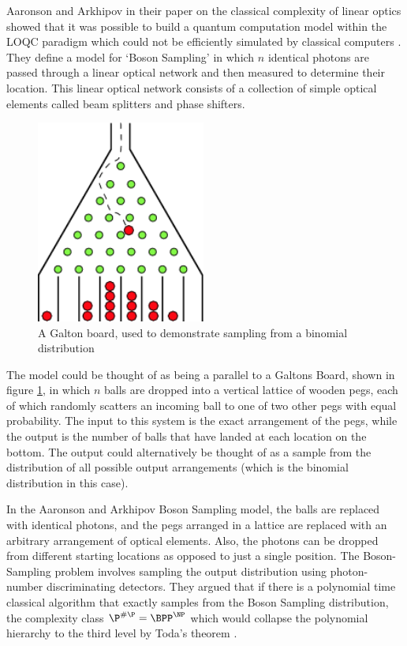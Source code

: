 \documentclass[ %
                    author={Manan Vaswani},
                supervisor={Dr. Raphael Clifford},
                    degree={MEng},
                     title={A multi-core CPU implementation of the classical Boson Sampling algorithm},
                  subtitle={},
                      type={},
                      year={2019} ]{dissertation}
\theoremstyle{plain}
\theoremstyle{definition}
\begin{document}
Aaronson and Arkhipov in their paper on the classical complexity of linear optics showed that it was possible to build a quantum computation model within the LOQC paradigm which could not be efficiently simulated by classical computers \cite{aaronson2011}. They define a model for `Boson Sampling' in which $n$ identical photons are passed through a linear optical network and then measured to determine their location. This linear optical network consists of a collection of simple optical elements called beam splitters and phase shifters.

\begin{figure}
	\centering
  \includegraphics[width=15em]{galton_board}
  \caption{A Galton board, used to demonstrate sampling from a binomial distribution \cite{galton_board}}
  \label{fig:galton_board}
\end{figure}

The model could be thought of as being a parallel to a Galtons Board, shown in figure \ref{fig:galton_board}, in which $n$ balls are dropped into a vertical lattice of wooden pegs, each of which randomly scatters an incoming ball to one of two other pegs with equal probability. The input to this system is the exact arrangement of the pegs, while the output is the number of balls that have landed at each location on the bottom. The output could alternatively be thought of as a sample from the distribution of all possible output arrangements (which is the binomial distribution in this case).

In the Aaronson and Arkhipov Boson Sampling model, the balls are replaced with identical photons, and the pegs arranged in a lattice are replaced with an arbitrary arrangement of optical elements. Also, the photons can be dropped from different starting locations as opposed to just a single position. The Boson-Sampling problem involves sampling the output distribution using photon-number discriminating detectors. They argued that if there is a polynomial time classical algorithm that exactly samples from the Boson Sampling distribution, the complexity class $\P^{\#\P} = \BPP^{\NP} $  which would collapse the polynomial hierarchy to the third level by Toda's theorem \cite{toda1991}.
\end{document}
